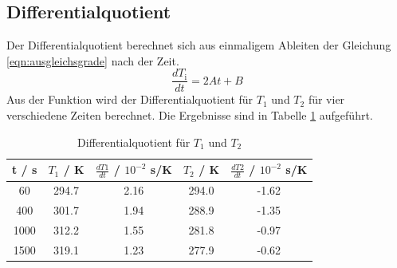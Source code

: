 \subsection{Differentialquotient}
Der Differentialquotient berechnet sich aus einmaligem Ableiten der Gleichung \ref{eqn:ausgleichsgrade} nach der Zeit.
\begin{equation}
  \frac{dT_\text{i}}{dt} = 2At + B
  \label{eqn:diffq}
\end{equation}
Aus der Funktion wird der Differentialquotient für $T_\text{1}$ und $T_\text{2}$ für vier verschiedene Zeiten berechnet. Die Ergebnisse sind in Tabelle \ref{tab:diffQ} aufgeführt.
\begin{table}
  \centering
  \begin{tabular}{c c c c c}
  	\toprule
	t / s & $T_\text{1}$ / K & $\frac{dT1}{dt}$ / $10^{-2}$ s/K & $T_\text{2}$ / K & $\frac{dT2}{dt}$ / $10^{-2}$ s/K \\
	\midrule
	60	  & 294.7   & 2.16 & 294.0 & -1.62 \\
	400	  & 301.7   & 1.94 & 288.9 & -1.35 \\
	1000	& 312.2   & 1.55 & 281.8 & -0.97 \\
	1500	& 319.1   & 1.23 & 277.9 & -0.62 \\
	\bottomrule
  \end{tabular}
  \caption{Differentialquotient für $T_\text{1}$ und $T_\text{2}$}
  \label{tab:diffQ}
\end{table}

